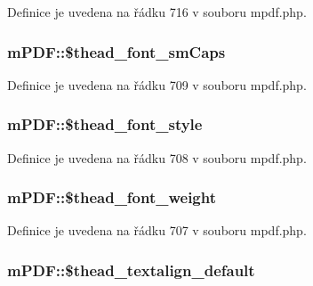 Definice je uvedena na řádku 716 v souboru mpdf.\-php.

\hypertarget{classm_p_d_f_a656bba9dbf70fbd5e07f2286124c5661}{
\subsubsection[{\$thead\-\_\-font\-\_\-sm\-Caps}]{\setlength{\rightskip}{0pt plus 5cm}m\-P\-D\-F\-::\$thead\-\_\-font\-\_\-sm\-Caps}}\label{classm_p_d_f_a656bba9dbf70fbd5e07f2286124c5661}


Definice je uvedena na řádku 709 v souboru mpdf.\-php.

\hypertarget{classm_p_d_f_a1058a117e29a40277f51e25a911b76ed}{
\subsubsection[{\$thead\-\_\-font\-\_\-style}]{\setlength{\rightskip}{0pt plus 5cm}m\-P\-D\-F\-::\$thead\-\_\-font\-\_\-style}}\label{classm_p_d_f_a1058a117e29a40277f51e25a911b76ed}


Definice je uvedena na řádku 708 v souboru mpdf.\-php.

\hypertarget{classm_p_d_f_a31de59e45d7543c5bf2b03a8eeab5a59}{
\subsubsection[{\$thead\-\_\-font\-\_\-weight}]{\setlength{\rightskip}{0pt plus 5cm}m\-P\-D\-F\-::\$thead\-\_\-font\-\_\-weight}}\label{classm_p_d_f_a31de59e45d7543c5bf2b03a8eeab5a59}


Definice je uvedena na řádku 707 v souboru mpdf.\-php.

\hypertarget{classm_p_d_f_a0c1be122e2c523840017c67a7f30a6af}{
\subsubsection[{\$thead\-\_\-textalign\-\_\-default}]{\setlength{\rightskip}{0pt plus 5cm}m\-P\-D\-F\-::\$thead\-\_\-textalign\-\_\-default}}\label{classm_p_d_f_a0c1be122e2c523840017c67a7f30a6af}



